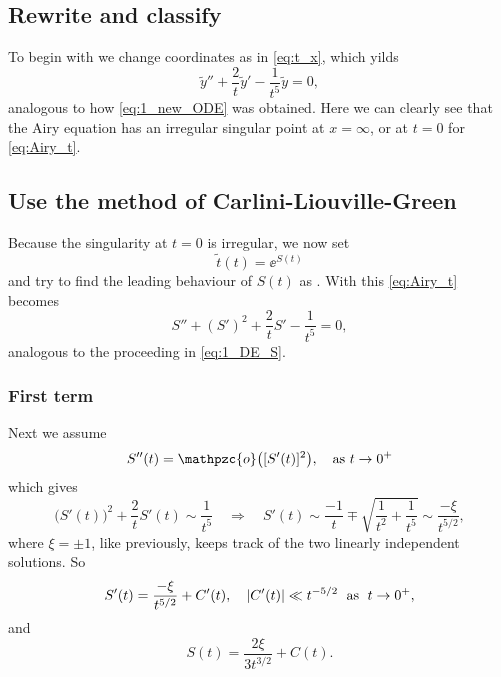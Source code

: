 \documentclass[11pt,letter, swedish, english
]{article}
\newcommand{\oh}{\ensuremath\mathpzc{o}}
\newcommand{\as}{\qcomma\text{as }}
\begin{document}
\subsection*{Rewrite and classify}
To begin with we change coordinates as in \eqref{eq:t_x}, which yilds 
\begin{equation}\label{eq:Airy_t}
\tilde{y}''+\frac{2}{t}\tilde{y}'-\frac{1}{t^5}\tilde{y} = 0,
\end{equation}
analogous to how \eqref{eq:1_new_ODE} was obtained. Here we can
clearly see that the Airy equation has an irregular singular point at
$x=\infty$, or at $t=0$ for \eqref{eq:Airy_t}.

\subsection*{Use the method of Carlini-Liouville-Green}
Because the singularity at $t=0$ is irregular, we now set
\begin{equation}
\tilde{t}(t)=\ee^{S(t)}
\end{equation}
and try to find the leading behaviour of $S(t)$ as \ttoz. With this
\eqref{eq:Airy_t} becomes
\begin{equation}\label{eq:Airy_S}
S''+(S')^2+\frac{2}{t}S'-\frac{1}{t^5}=0,
\end{equation}
analogous to the proceeding in \eqref{eq:1_DE_S}. 

\subsubsection{First term}
Next we assume
\begin{equation}
S''(t)=\oh\qty([S'(t)]^2)\as\ttoz
\end{equation}
which gives
\begin{equation}
\Big(S'(t)\Big)^2+\frac{2}{t}S'(t)\sim\frac{1}{t^5}
\quad\Longrightarrow\quad
S'(t)\sim\frac{-1}{t}\mp\sqrt{\frac{1}{t^2}+\frac{1}{t^5}}
\sim\frac{-\xi}{t^{5/2}},
\end{equation}
where $\xi=\pm1$, like previously, keeps track of the two linearly
independent solutions. So
\begin{equation}\label{eq:2_S'}
S'(t)=\frac{-\xi}{t^{5/2}}+C'(t)\qcomma
\abs{C'(t)} \ll t^{-5/2} \;\text{ as }\; \ttoz,
\end{equation}
and
\begin{equation}\label{eq:2_S}
S(t)=\frac{2\xi}{3t^{3/2}}+C(t).
\end{equation}
\end{document}
